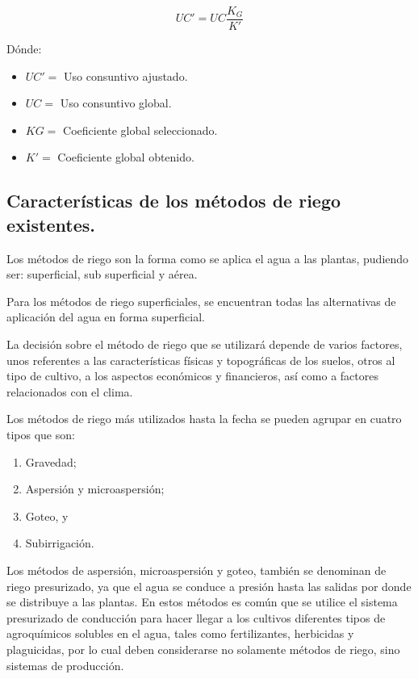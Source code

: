 \begin{equation}
	UC'=UC \frac{K_G}{K'}
\end{equation}

Dónde:
\begin{itemize}
	\item $UC'=$ Uso consuntivo ajustado.
	\item $UC =$ Uso consuntivo global.
	\item $KG =$ Coeficiente global seleccionado.
	\item $K'=$ Coeficiente global obtenido.
\end{itemize}


\subsection{Características de los métodos de riego existentes.}

Los métodos de riego son la forma como se aplica el agua a las plantas,
pudiendo ser: superficial, sub superficial y aérea.

Para los métodos de riego superficiales, se encuentran todas las alternativas de
aplicación del agua en forma superficial.

La decisión sobre el método de riego que se utilizará depende de varios factores,
unos referentes a las características físicas y topográficas de los suelos, otros al tipo de
cultivo, a los aspectos económicos y financieros, así como a factores relacionados con
el clima.

Los métodos de riego más utilizados hasta la fecha se pueden agrupar en cuatro
tipos que son:
\begin{enumerate}
	\item Gravedad;
	\item Aspersión y microaspersión;
	\item Goteo, y
	\item Subirrigación.
\end{enumerate}

Los métodos de aspersión, microaspersión y goteo, también se denominan de
riego presurizado, ya que el agua se conduce a presión hasta las salidas por donde se
distribuye a las plantas. En estos métodos es común que se utilice el sistema
presurizado de conducción para hacer llegar a los cultivos diferentes tipos de
agroquímicos solubles en el agua, tales como fertilizantes, herbicidas y plaguicidas, por
lo cual deben considerarse no solamente métodos de riego, sino sistemas de
producción.

